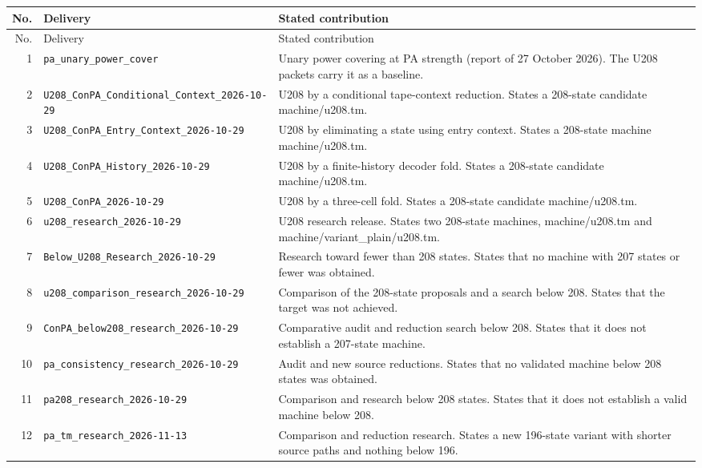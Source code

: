 \begingroup\footnotesize
\begin{longtable}{@{}rp{}p{}@{}}
\toprule No. & Delivery & Stated contribution\\\midrule\endfirsthead
\toprule No. & Delivery & Stated contribution\\\midrule\endhead
1 & \nolinkurl{pa_unary_power_cover} & Unary power covering at PA strength (report of 27 October 2026). The U208 packets carry it as a baseline.\\[5pt]
2 & \nolinkurl{U208_ConPA_Conditional_Context_2026-10-29} & U208 by a conditional tape-context reduction. States a 208-state candidate machine/u208.tm.\\[5pt]
3 & \nolinkurl{U208_ConPA_Entry_Context_2026-10-29} & U208 by eliminating a state using entry context. States a 208-state machine machine/u208.tm.\\[5pt]
4 & \nolinkurl{U208_ConPA_History_2026-10-29} & U208 by a finite-history decoder fold. States a 208-state candidate machine/u208.tm.\\[5pt]
5 & \nolinkurl{U208_ConPA_2026-10-29} & U208 by a three-cell fold. States a 208-state candidate machine/u208.tm.\\[5pt]
6 & \nolinkurl{u208_research_2026-10-29} & U208 research release. States two 208-state machines, machine/u208.tm and machine/variant\_plain/u208.tm.\\[5pt]
7 & \nolinkurl{Below_U208_Research_2026-10-29} & Research toward fewer than 208 states. States that no machine with 207 states or fewer was obtained.\\[5pt]
8 & \nolinkurl{u208_comparison_research_2026-10-29} & Comparison of the 208-state proposals and a search below 208. States that the target was not achieved.\\[5pt]
9 & \nolinkurl{ConPA_below208_research_2026-10-29} & Comparative audit and reduction search below 208. States that it does not establish a 207-state machine.\\[5pt]
10 & \nolinkurl{pa_consistency_research_2026-10-29} & Audit and new source reductions. States that no validated machine below 208 states was obtained.\\[5pt]
11 & \nolinkurl{pa208_research_2026-10-29} & Comparison and research below 208 states. States that it does not establish a valid machine below 208.\\[5pt]
12 & \nolinkurl{pa_tm_research_2026-11-13} & Comparison and reduction research. States a new 196-state variant with shorter source paths and nothing below 196.\\[5pt]

\end{longtable}

